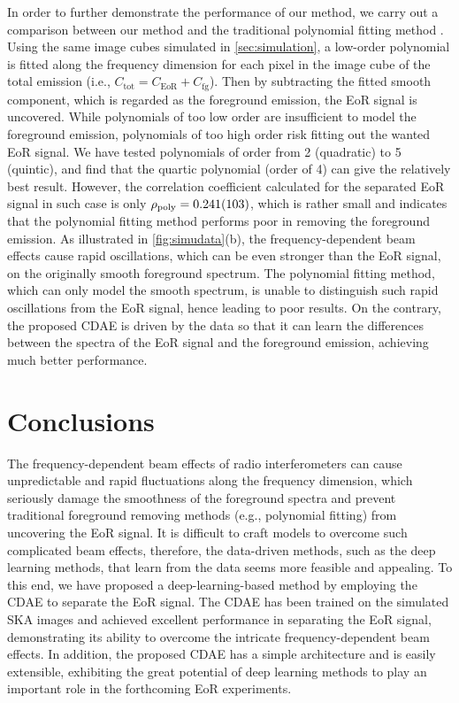 \documentclass[letters,fleqn,usenatbib,onecolumn]{mnras}
\newcommand{\R}[1]{\mathrm{#1}}
\begin{document}
In order to further demonstrate the performance of our method, we carry
out a comparison between our method and the traditional polynomial
fitting method \citep[e.g.,][]{wang2006,liu2009ps}.
Using the same image cubes simulated in \autoref{sec:simulation},
a low-order polynomial is fitted along the frequency dimension for each
pixel in the image cube of the total emission (i.e.,
$C_{\R{tot}} = C_{\R{EoR}} + C_{\R{fg}}$).
Then by subtracting the fitted smooth component, which is regarded as
the foreground emission, the EoR signal is uncovered.
While polynomials of too low order are insufficient to model the
foreground emission, polynomials of too high order risk fitting out
the wanted EoR signal.
We have tested polynomials of order from 2 (quadratic) to 5 (quintic),
and find that the quartic polynomial (order of 4) can give the
relatively best result.
However, the correlation coefficient calculated for the separated EoR
signal in such case is only $\rho_{\R{poly}} = \num{0.241 +- 0.103}$,
which is rather small and indicates that the polynomial fitting method
performs poor in removing the foreground emission.
As illustrated in \autoref{fig:simudata}(b), the frequency-dependent
beam effects cause rapid oscillations, which can be even stronger than
the EoR signal, on the originally smooth foreground spectrum.
The polynomial fitting method, which can only model the smooth
spectrum, is unable to distinguish such rapid oscillations from the
EoR signal, hence leading to poor results.
On the contrary, the proposed CDAE is driven by the data so that it can
learn the differences between the spectra of the EoR signal and the
foreground emission, achieving much better performance.


\section{Conclusions}
\label{sec:conclusions}

The frequency-dependent beam effects of radio interferometers can cause
unpredictable and rapid fluctuations along the frequency dimension,
which seriously damage the smoothness of the foreground spectra and
prevent traditional foreground removing methods (e.g., polynomial
fitting) from uncovering the EoR signal.
It is difficult to craft models to overcome such complicated beam
effects, therefore, the data-driven methods, such as the deep learning
methods, that learn from the data seems more feasible and appealing.
To this end, we have proposed a deep-learning-based method by employing
the CDAE to separate the EoR signal.
The CDAE has been trained on the simulated SKA images and achieved
excellent performance in separating the EoR signal, demonstrating its
ability to overcome the intricate frequency-dependent beam effects.
In addition, the proposed CDAE has a simple architecture and is easily
extensible, exhibiting the great potential of deep learning methods
to play an important role in the forthcoming EoR experiments.
\end{document}
